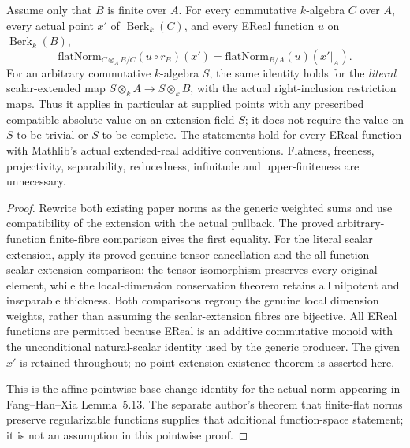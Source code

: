 \begin{theorem}
\label{spectrum:paper-flat-norm-base-change}
\leanok
{}
Assume only that $B$ is finite over $A$. For every commutative $k$-algebra
$C$ over $A$, every actual point $x'$ of $\operatorname{Berk}_k(C)$, and
every EReal function $u$ on $\operatorname{Berk}_k(B)$,
\[
 \mathrm{flatNorm}_{C\otimes_A B/C}(u\circ r_B)(x')
 =\mathrm{flatNorm}_{B/A}(u)(x'|_A).
\]
For an arbitrary commutative $k$-algebra $S$, the same identity holds for
the \emph{literal} scalar-extended map
$S\otimes_kA\to S\otimes_kB$, with the actual right-inclusion restriction
maps. Thus it applies in particular at supplied points with any prescribed
compatible absolute value on an extension field $S$; it does not require
the value on $S$ to be trivial or $S$ to be complete.
The statements hold for every EReal function with Mathlib's actual
extended-real additive conventions. Flatness, freeness, projectivity,
separability, reducedness, infinitude and upper-finiteness are unnecessary.
\end{theorem}
\begin{proof}
Rewrite both existing paper norms as the generic weighted sums and use
compatibility of the extension with the actual pullback. The proved
arbitrary-function finite-fibre comparison gives the first equality.
For the literal scalar extension, apply its proved genuine tensor
cancellation and the all-function scalar-extension comparison: the tensor
isomorphism preserves every original element, while the local-dimension
conservation theorem retains all nilpotent and inseparable thickness.
Both comparisons regroup the genuine local dimension weights, rather
than assuming the scalar-extension fibres are bijective. All EReal
functions are permitted because EReal is an additive commutative monoid
with the unconditional natural-scalar identity used by the generic
producer. The given $x'$ is retained throughout; no point-extension
existence theorem is asserted here.

This is the affine pointwise base-change identity for the actual norm
appearing in Fang--Han--Xia Lemma~5.13. The separate author's theorem
that finite-flat norms preserve regularizable functions supplies that
additional function-space statement; it is not an assumption in this
pointwise proof.
\end{proof}
